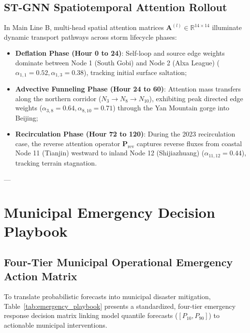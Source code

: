 \subsection{ST-GNN Spatiotemporal Attention Rollout}
\label{subsec:attention_rollout}

In Main Line B, multi-head spatial attention matrices $\mathbf{A}^{(l)} \in \mathbb{R}^{14 \times 14}$ illuminate dynamic transport pathways across storm lifecycle phases:
\begin{itemize}
    \item \textbf{Deflation Phase (Hour 0 to 24)}: Self-loop and source edge weights dominate between Node 1 (South Gobi) and Node 2 (Alxa League) ($\alpha_{1, 1} = 0.52, \alpha_{1, 3} = 0.38$), tracking initial surface saltation;
    \item \textbf{Advective Funneling Phase (Hour 24 to 60)}: Attention mass transfers along the northern corridor ($N_3 \to N_8 \to N_{10}$), exhibiting peak directed edge weights ($\alpha_{3, 8} = 0.64, \alpha_{8, 10} = 0.71$) through the Yan Mountain gorge into Beijing;
    \item \textbf{Recirculation Phase (Hour 72 to 120)}: During the 2023 recirculation case, the reverse attention operator $\mathbf{P}_{\text{rev}}$ captures reverse fluxes from coastal Node 11 (Tianjin) westward to inland Node 12 (Shijiazhuang) ($\alpha_{11, 12} = 0.44$), tracking terrain stagnation.
\end{itemize}

---

\section{Municipal Emergency Decision Playbook}
\label{sec:emergency_playbook}

\subsection{Four-Tier Municipal Operational Emergency Action Matrix}
\label{subsec:four_tier_matrix}

To translate probabilistic forecasts into municipal disaster mitigation, Table~\ref{tab:emergency_playbook} presents a standardized, four-tier emergency response decision matrix linking model quantile forecasts ($[P_{10}, P_{90}]$) to actionable municipal interventions.

